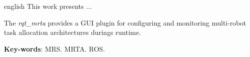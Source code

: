 \begin{resumo}[Abstract]
    \begin{otherlanguage*}{english}
        This work presents ...
        
        The \textit{rqt\_mrta} provides a GUI plugin for configuring and monitoring multi-robot task allocation architectures durings runtime.
        
        \vspace{\onelineskip}
        
        \noindent 
        \textbf{Key-words}: MRS. MRTA. ROS.
    \end{otherlanguage*}
\end{resumo}
\newpage